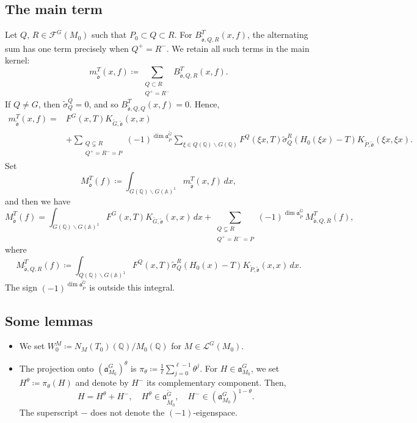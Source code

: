 \documentclass[12pt]{amsart}
\theoremstyle{definition}
\theoremstyle{plain}
\theoremstyle{remark}
\def\Q{\mathbb{Q}}%
\def\A{\mathbb{A}}%
\def\bs{\backslash}%
\newcommand{\fa}{\mathfrak{a}}
\newcommand{\cF}{\mathcal{F}}
\newcommand{\cL}{\mathcal{L}}
\numberwithin{equation}{section}
\newcommand{\tG}{\widetilde{G}}
\newcommand{\tM}{\widetilde{M}}
\newcommand{\tP}{\widetilde{P}}
\newcommand{\tfo}{\widetilde{\mathfrak{o}}}
\begin{document}
\subsection{The main term}

Let $Q$, $R\in\cF^G(M_0)$ such that $P_0\subset Q\subset R$. 
For $B_{\tfo,Q,R}^T(x,f)$, the alternating sum has one term precisely when $Q^+=R^-$.
We retain all such terms in the main kernel:
\begin{equation*}
 m_{\tfo}^T(x,f)
   \coloneqq \sum_{\substack{Q\subset R\\Q^+=R^-}}
         B_{\tfo,Q,R}^T(x,f).
\end{equation*}
If $Q\neq G$, then $\widetilde\sigma_Q^Q=0$, and so $B_{\tfo,Q,Q}^T(x,f)=0$. 
Hence, 
\begin{align*}    
 m_{\tfo}^T(x,f)=& F^G(x,T)K_{\tG,\tfo}(x,x) \\
 &+\sum_{\substack{Q\subsetneq R\\Q^+=R^-=P}}
          (-1)^{\dim\fa_{\tP}^{\tG}}\sum_{\xi\in Q(\Q)\backslash G(\Q)}F^Q(\xi x,T) \widetilde\sigma_Q^R(H_0(\xi x)-T)
                 K_{\tP,\tfo}(\xi x,\xi x).
\end{align*}
Set
\[
 M_{\tfo}^T(f)
  \coloneqq\int_{G(\Q)\bs G(\A)^1}m_{\tfo}^T(x,f)\,dx,
\]
and then we have
\[
 M_{\tfo}^T(f)= \int_{G(\Q)\bs G(\A)^1}F^G(x,T)K_{\tG,\tfo}(x,x)\,dx+\sum_{\substack{Q\subsetneq R\\Q^+=R^-=P}}
          (-1)^{\dim\fa_{\tP}^{\tG}}\, M_{\tfo,Q,R}^T(f),
\]
where
\begin{equation*}
 M_{\tfo,Q,R}^T(f)
 \coloneqq \int_{Q(\Q)\bs G(\A)^1}F^Q(x,T)\widetilde\sigma_Q^R(H_0(x)-T)
                 K_{\tP,\tfo}(x,x)\,dx.
\end{equation*}
The sign $(-1)^{\dim\fa_{\tP}^{\tG}}$ is outside this integral.




\subsection{Some lemmas}


\begin{itemize}
    \item We set $W^M_0 \coloneqq N_{M}(T_0)(\Q)/M_0(\Q)$ for $M\in\cL^G(M_0)$. 
    \item The projection onto $(\fa_{M_0}^G)^\theta$ is $\pi_\theta\coloneqq \frac1\ell\sum_{j=0}^{\ell-1}\theta^j$. 
          For $H\in\fa_{M_0}^G$, we set $H^\theta\coloneqq \pi_\theta(H)$ and denote by $H^-$ its complementary component. 
          Then, 
          \[
          H=H^\theta+H^-, \quad  H^\theta\in\fa_{\tM_0}^{\tG}, \quad H^-\in (\fa_{M_0}^G)^{1-\theta}.
          \]
          The superscript $-$ does not denote the $(-1)$-eigenspace.
\end{itemize}
\end{document}
